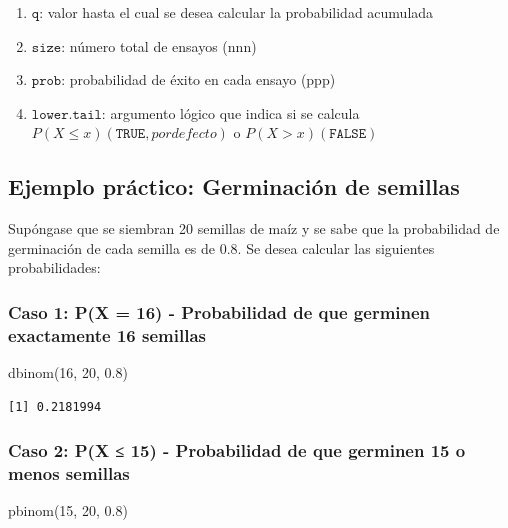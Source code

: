 \documentclass[
  spanish,
  letterpaper,
]{book}
\newenvironment{Shaded}{\begin{snugshade}}{\end{snugshade}}
\newcommand{\DecValTok}[1]{\textcolor[rgb]{0.68,0.00,0.00}{#1}}
\newcommand{\FloatTok}[1]{\textcolor[rgb]{0.68,0.00,0.00}{#1}}
\newcommand{\FunctionTok}[1]{\textcolor[rgb]{0.28,0.35,0.67}{#1}}
\newcommand{\NormalTok}[1]{\textcolor[rgb]{0.00,0.23,0.31}{#1}}
\begin{document}
\begin{enumerate}
\def\labelenumi{\arabic{enumi}.}
\item
  \(\texttt{q}\): valor hasta el cual se desea calcular la probabilidad
  acumulada
\item
  \(\texttt{size}\): número total de ensayos (nnn)
\item
  \(\texttt{prob}\): probabilidad de éxito en cada ensayo (ppp)
\item
  \(\texttt{lower.tail}\): argumento lógico que indica si se calcula
  \(P(X \leq x) (\texttt{TRUE}, por defecto)\) o
  \(P(X > x) (\texttt{FALSE})\)
\end{enumerate}

\subsection{Ejemplo práctico: Germinación de
semillas}\label{ejemplo-pruxe1ctico-germinaciuxf3n-de-semillas}

Supóngase que se siembran 20 semillas de maíz y se sabe que la
probabilidad de germinación de cada semilla es de 0.8. Se desea calcular
las siguientes probabilidades:

\subsubsection{Caso 1: P(X = 16) - Probabilidad de que germinen
exactamente 16
semillas}\label{caso-1-px-16---probabilidad-de-que-germinen-exactamente-16-semillas}

\begin{Shaded}
\begin{Highlighting}[]
\FunctionTok{dbinom}\NormalTok{(}\DecValTok{16}\NormalTok{, }\DecValTok{20}\NormalTok{, }\FloatTok{0.8}\NormalTok{)}
\end{Highlighting}
\end{Shaded}

\begin{verbatim}
[1] 0.2181994
\end{verbatim}

\subsubsection{Caso 2: P(X ≤ 15) - Probabilidad de que germinen 15 o
menos
semillas}\label{caso-2-px-15---probabilidad-de-que-germinen-15-o-menos-semillas}

\begin{Shaded}
\begin{Highlighting}[]
\FunctionTok{pbinom}\NormalTok{(}\DecValTok{15}\NormalTok{, }\DecValTok{20}\NormalTok{, }\FloatTok{0.8}\NormalTok{)}
\end{Highlighting}
\end{Shaded}
\end{document}
